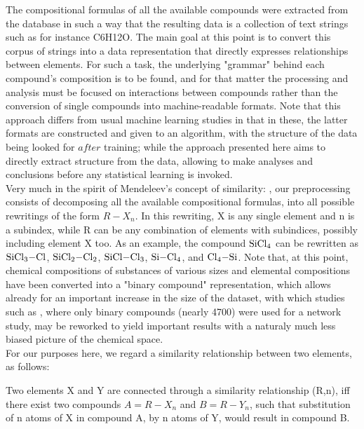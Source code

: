 \documentclass[article]{article}
\begin{document}
The compositional formulas of all the available compounds were extracted from the database in such a way that the resulting data is a collection of text strings such as for instance C6H12O. The main goal at this point is to convert this corpus of strings into a data representation that directly expresses relationships between elements. For such a task, the underlying "grammar" behind each compound's composition is to be found, and for that matter the processing and analysis must be focused on interactions between compounds rather than the conversion of single compounds into machine-readable formats. Note that this approach differs from usual machine learning studies in that in these, the latter formats are constructed and given to an algorithm, with the structure of the data being looked for $\textit{after}$ training; while the  approach presented here aims to directly extract structure from the data, allowing to make analyses and conclusions before any statistical learning is invoked.\\

Very much in the spirit of Mendeleev's concept of similarity: , our preprocessing consists of decomposing all the available compositional formulas, into all possible rewritings of the form $R-X_n$. In this rewriting, X is any single element and n is a subindex, while R can be any combination of elements with subindices, possibly including element X too. As an example, the compound $\ce{SiCl4}$ can be rewritten as $\ce{SiCl3-Cl}$, $\ce{SiCl2-Cl2}$, $\ce{SiCl-Cl3}$, $\ce{Si-Cl4}$, and $\ce{Cl4-Si}$. Note that, at this point, chemical compositions of substances of various sizes and elemental compositions have been converted into a "binary compound" representation, which allows already for an important increase in the size of the dataset, with which studies such as \cite{Leal2012}, where only binary compounds (nearly 4700) were used for a network study, may be reworked to yield important results with a naturaly much less biased picture of the chemical space. \\

For our purposes here, we regard a similarity relationship between two elements, as follows:

\begin{definition}
\label{def:def1}
Two elements X and Y are connected through a similarity relationship (R,n), iff there exist two compounds $A = R-X_n$ and $B = R-Y_n$, such that substitution of n atoms of X in compound A, by n atoms of Y, would result in compound B.
\end{definition}
\end{document}
